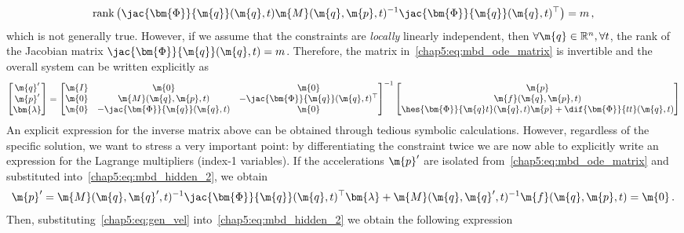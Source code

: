 %
\begin{equation}
  \mathrm{rank}\left( \jac{\bm{\Phi}}{\m{q}}(\m{q}, t) \m{M}(\m{q}, \m{p}, t)^{-1} \jac{\bm{\Phi}}{\m{q}}(\m{q}, t)^{\top}\right) = m \, \text{,}
  \label{chap5:eq:compression}
\end{equation}
%
which is not generally true. However, if we assume that the constraints are \emph{locally} linearly independent, then $\forall\m{q}\in\mathbb{R}^{n},\forall t$, the rank of the Jacobian matrix $\jac{\bm{\Phi}}{\m{q}}(\m{q}, t) = m$. Therefore, the matrix in~\eqref{chap5:eq:mbd_ode_matrix} is invertible and the overall system can be written explicitly as
%
\begin{equation*}
  \begin{bmatrix}
    \m{q}^{\prime} \\ \m{p}^{\prime} \\ \bm{\lambda}
  \end{bmatrix} = \begin{bmatrix}
    \m{I} & \m{0} & \m{0} \\
    \m{0} & \m{M}(\m{q}, \m{p}, t) & -\jac{\bm{\Phi}}{\m{q}}(\m{q}, t)^{\top} \\
    \m{0} & -\jac{\bm{\Phi}}{\m{q}}(\m{q}, t) & \m{0}
  \end{bmatrix}^{-1}
  \begin{bmatrix}
    \m{p} \\
    \m{f}(\m{q},\m{p},t) \\
    \hes{\bm{\Phi}}{\m{q}t}(\m{q}, t)\m{p} + \dif{\bm{\Phi}}{tt}(\m{q}, t)
  \end{bmatrix}
\end{equation*}
%
An explicit expression for the inverse matrix above can be obtained through tedious symbolic calculations. However, regardless of the specific solution, we want to stress a very important point: by differentiating the constraint twice we are now able to explicitly write an expression for the Lagrange multipliers (index-1 variables). If the accelerations $\m{p}^{\prime}$ are isolated from~\eqref{chap5:eq:mbd_ode_matrix} and substituted into~\eqref{chap5:eq:mbd_hidden_2}, we obtain
%
\begin{equation}
  \m{p}^{\prime} = \m{M}(\m{q}, \m{q}^{\prime}, t)^{-1} \jac{\bm{\Phi}}{\m{q}}(\m{q}, t)^{\top}\bm{\lambda} + \m{M}(\m{q}, \m{q}^{\prime}, t)^{-1}\m{f}(\m{q},\m{p},t) = \m{0} \, \text{.}
  \label{chap5:eq:gen_vel}
\end{equation}
%
Then, substituting~\eqref{chap5:eq:gen_vel} into~\eqref{chap5:eq:mbd_hidden_2} we obtain the following expression
